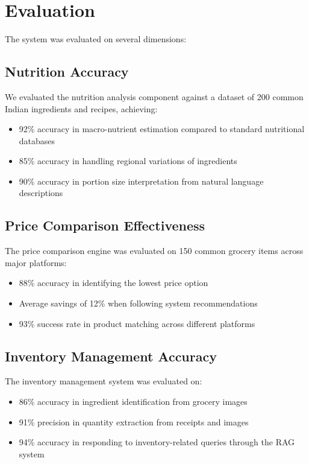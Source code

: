\documentclass[10pt,twocolumn,letterpaper]{article}
\begin{document}
\section{Evaluation}

The system was evaluated on several dimensions:

\subsection{Nutrition Accuracy}

We evaluated the nutrition analysis component against a dataset of 200 common Indian ingredients and recipes, achieving:
\begin{itemize}[noitemsep,topsep=0pt]
    \item 92\% accuracy in macro-nutrient estimation compared to standard nutritional databases
    \item 85\% accuracy in handling regional variations of ingredients
    \item 90\% accuracy in portion size interpretation from natural language descriptions
\end{itemize}

\subsection{Price Comparison Effectiveness}

The price comparison engine was evaluated on 150 common grocery items across major platforms:
\begin{itemize}[noitemsep,topsep=0pt]
    \item 88\% accuracy in identifying the lowest price option
    \item Average savings of 12\% when following system recommendations
    \item 93\% success rate in product matching across different platforms
\end{itemize}

\subsection{Inventory Management Accuracy}

The inventory management system was evaluated on:
\begin{itemize}[noitemsep,topsep=0pt]
    \item 86\% accuracy in ingredient identification from grocery images
    \item 91\% precision in quantity extraction from receipts and images
    \item 94\% accuracy in responding to inventory-related queries through the RAG system
\end{itemize}
\end{document}
